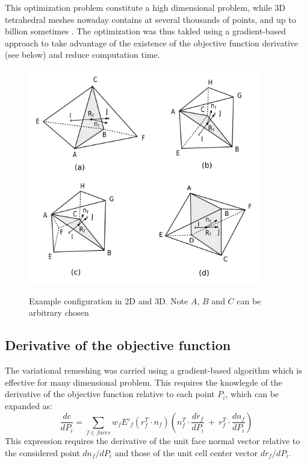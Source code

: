 \documentclass[11pt]{article}
\begin{document}
This optimization problem constitute a high dimensional problem, while 3D tetrahedral meshes nowaday contains at several thousands of points, and up to billion sometimes \cite{neau_massively_2020}.
The optimization was thus takled using a gradient-based approach to take advantage of the existence of the objective function derivative (see below) and reduce computation time.

\begin{figure}[h!]
  \centering
  \includegraphics[width=0.9\textwidth]{figures/cases.png}
  \label{cases_figure}
  \caption{Example configuration in 2D and 3D. Note $A$, $B$ and $C$ can be arbitrary chosen}
\end{figure}



\subsection{Derivative of the objective function}

The variational remeshing was carried using a gradient-based algorithm which is effective for many dimensional problem. 
This requires the knowlegde of the derivative of the objective function relative to each point $P_i$, which can be expanded as:
%
\begin{equation}
\frac{dc}{dP_i} = \sum_{f \in faces} w_f E'_f\left( r_f^T \cdot n_f \right) \left(n_f^T \cdot \frac{d r_f}{dP_i}\ +\ r_f^T \cdot \frac{d n_f}{dP_i}\right)
\label{eq:derivative_cost}
\end{equation}
%
This expression requires the derivative of the unit face normal vector relative to the considered point $d n_f / dP_i$ and those of the unit cell center vector $d r_f / dP_i$.
\end{document}
